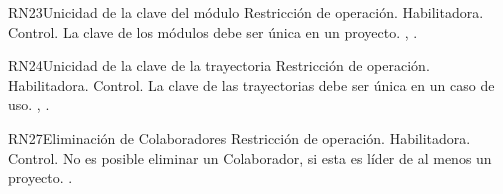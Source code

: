\begin{BussinesRule}{RN23}{Unicidad de la clave del módulo} 
	\BRitem[Tipo:] Restricción de operación. 
	\BRitem[Clase:] Habilitadora. 
	\BRitem[Nivel:] Control. %
	\BRitem[Descripción:] La clave de los módulos debe ser única en un proyecto.
	 , . 
\end{BussinesRule}

\begin{BussinesRule}{RN24}{Unicidad de la clave de la trayectoria} 
	\BRitem[Tipo:] Restricción de operación. 
	\BRitem[Clase:] Habilitadora. 
	\BRitem[Nivel:] Control. %
	\BRitem[Descripción:] La clave de las trayectorias debe ser única en un caso de uso.
	 , . 
\end{BussinesRule}



\begin{BussinesRule}{RN27}{Eliminación de Colaboradores} 
	\BRitem[Tipo:] Restricción de operación. 
	\BRitem[Clase:] Habilitadora. 
	\BRitem[Nivel:] Control. %
	\BRitem[Descripción:] No es posible eliminar un Colaborador, si esta es líder de al menos un proyecto.
	 . 
\end{BussinesRule}

